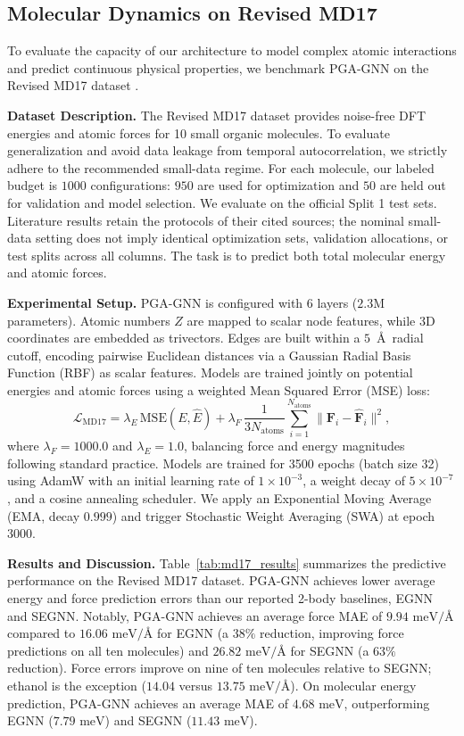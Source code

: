 \documentclass[10pt]{article}
\begin{document}
\subsection{Molecular Dynamics on Revised MD17}

To evaluate the capacity of our architecture to model complex atomic interactions and predict continuous physical properties, we benchmark PGA-GNN on the Revised MD17 dataset \citep{rmd17}.

\noindent\textbf{Dataset Description.}
The Revised MD17 dataset \citep{md17} provides noise-free DFT energies and atomic forces for 10 small organic molecules. To evaluate generalization and avoid data leakage from temporal autocorrelation, we strictly adhere to the recommended small-data regime. For each molecule, our labeled budget is $1000$ configurations: $950$ are used for optimization and $50$ are held out for validation and model selection. We evaluate on the official Split 1 test sets. Literature results retain the protocols of their cited sources; the nominal small-data setting does not imply identical optimization sets, validation allocations, or test splits across all columns. The task is to predict both total molecular energy and atomic forces.

\noindent\textbf{Experimental Setup.}
PGA-GNN is configured with 6 layers ($2.3$M parameters). Atomic numbers $Z$ are mapped to scalar node features, while 3D coordinates are embedded as trivectors. Edges are built within a $5$~\AA\ radial cutoff, encoding pairwise Euclidean distances via a Gaussian Radial Basis Function (RBF) \citep{rbf} as scalar features. Models are trained jointly on potential energies and atomic forces using a weighted Mean Squared Error (MSE) loss:
\begin{equation}
    \mathcal{L}_{\text{MD17}} = \lambda_E \, \mathrm{MSE}(E, \hat{E}) + \lambda_F \, \frac{1}{3N_{\text{atoms}}} \sum_{i=1}^{N_{\text{atoms}}} \|\mathbf{F}_i - \hat{\mathbf{F}}_i\|^2,
    \label{eq:loss_md17}
\end{equation}
where $\lambda_F = 1000.0$ and $\lambda_E = 1.0$, balancing force and energy magnitudes following standard practice. Models are trained for 3500 epochs (batch size 32) using AdamW with an initial learning rate of $1 \times 10^{-3}$, a weight decay of $5 \times 10^{-7}$, and a cosine annealing scheduler. We apply an Exponential Moving Average (EMA, decay $0.999$) and trigger Stochastic Weight Averaging (SWA) at epoch 3000.

\noindent\textbf{Results and Discussion.}
Table~\ref{tab:md17_results} summarizes the predictive performance on the Revised MD17 dataset. PGA-GNN achieves lower average energy and force prediction errors than our reported 2-body baselines, EGNN and SEGNN. Notably, PGA-GNN achieves an average force MAE of $9.94\text{ meV/\AA}$ compared to $16.06\text{ meV/\AA}$ for EGNN (a $38\%$ reduction, improving force predictions on all ten molecules) and $26.82\text{ meV/\AA}$ for SEGNN (a $63\%$ reduction). Force errors improve on nine of ten molecules relative to SEGNN; ethanol is the exception ($14.04$ versus $13.75\text{ meV/\AA}$). On molecular energy prediction, PGA-GNN achieves an average MAE of $4.68\text{ meV}$, outperforming EGNN ($7.79\text{ meV}$) and SEGNN ($11.43\text{ meV}$).
\end{document}
